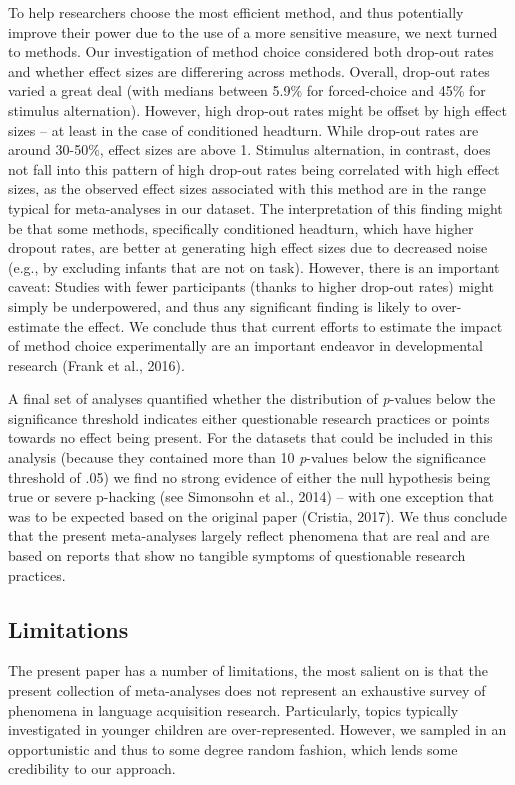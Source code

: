 \documentclass[english,floatsintext,man]{apa6}
\begin{document}
To help researchers choose the most efficient method, and thus
potentially improve their power due to the use of a more sensitive
measure, we next turned to methods. Our investigation of method choice
considered both drop-out rates and whether effect sizes are differering
across methods. Overall, drop-out rates varied a great deal (with
medians between 5.9\% for forced-choice and 45\% for stimulus
alternation). However, high drop-out rates might be offset by high
effect sizes -- at least in the case of conditioned headturn. While
drop-out rates are around 30-50\%, effect sizes are above 1. Stimulus
alternation, in contrast, does not fall into this pattern of high
drop-out rates being correlated with high effect sizes, as the observed
effect sizes associated with this method are in the range typical for
meta-analyses in our dataset. The interpretation of this finding might
be that some methods, specifically conditioned headturn, which have
higher dropout rates, are better at generating high effect sizes due to
decreased noise (e.g., by excluding infants that are not on task).
However, there is an important caveat: Studies with fewer participants
(thanks to higher drop-out rates) might simply be underpowered, and thus
any significant finding is likely to over-estimate the effect. We
conclude thus that current efforts to estimate the impact of method
choice experimentally are an important endeavor in developmental
research (Frank et al., 2016).

A final set of analyses quantified whether the distribution of
\emph{p}-values below the significance threshold indicates either
questionable research practices or points towards no effect being
present. For the datasets that could be included in this analysis
(because they contained more than 10 \emph{p}-values below the
significance threshold of .05) we find no strong evidence of either the
null hypothesis being true or severe p-hacking (see Simonsohn et al.,
2014) -- with one exception that was to be expected based on the
original paper (Cristia, 2017). We thus conclude that the present
meta-analyses largely reflect phenomena that are real and are based on
reports that show no tangible symptoms of questionable research
practices.

\subsection{Limitations}\label{limitations}

The present paper has a number of limitations, the most salient on is
that the present collection of meta-analyses does not represent an
exhaustive survey of phenomena in language acquisition research.
Particularly, topics typically investigated in younger children are
over-represented. However, we sampled in an opportunistic and thus to
some degree random fashion, which lends some credibility to our
approach.
\end{document}
